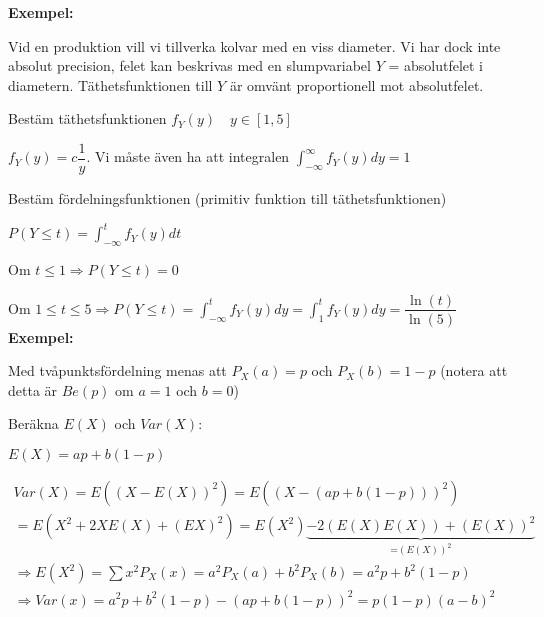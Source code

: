 \par\bigskip
\noindent\textbf{Exempel:}\par
\noindent Vid en produktion vill vi tillverka kolvar med en viss diameter. Vi har dock inte absolut precision, felet kan beskrivas med en slumpvariabel $Y$ = absolutfelet i diametern. Täthetsfunktionen till $Y$ är omvänt proportionell mot absolutfelet.
\par\bigskip
\noindent Bestäm täthetsfunktionen $f_Y(y)\quad y\in[1,5]$\par
\noindent $f_Y(y) = c\dfrac{1}{y}$. Vi måste även ha att integralen $\int_{-\infty}^{\infty}f_Y(y)dy=1$
\par\bigskip
\noindent Bestäm fördelningsfunktionen (primitiv funktion till täthetsfunktionen)\par
\noindent $P(Y\leq t) = \int_{-\infty}^{t}f_Y(y)dt$\par
\noindent Om $t\leq1\Rightarrow P(Y\leq t)=0$\par
\noindent Om $1\leq t\leq5\Rightarrow P(Y\leq t) = \int_{-\infty}^{t}f_Y(y)dy = \int_{1}^{t}f_Y(y)dy=\dfrac{\ln(t)}{\ln(5)}$
\newpage
\noindent\textbf{Exempel:}\par
\noindent Med tvåpunktsfördelning menas att $P_X(a)=p$ och $P_X(b)=1-p$ (notera att detta är $Be(p)$ om $a=1$ och $b=0$)\par
\noindent Beräkna $E(X)$ och $Var(X)$:\par
\noindent $E(X) = ap+b(1-p)$\par

\begin{equation*}
  \begin{gathered}
  Var(X) = E((X-E(X))^2) = E((X-(ap+b(1-p)))^2)\\
  =E(X^2+2XE(X)+(EX)^2)=E(X^2)\underbrace{-2(E(X)E(X))+(E(X))^2}_{\text{=$(E(X))^2$}}\\
  \Rightarrow E(X^2) = \sum x^2P_X(x) = a^2P_X(a)+b^2P_X(b) = a^2p+b^2(1-p)\\
  \Rightarrow Var(x) = a^2p+b^2(1-p) - (ap+b(1-p))^2 = p(1-p)(a-b)^2
  \end{gathered}
\end{equation*}
